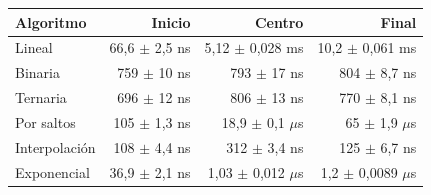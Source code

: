 {\small
\begin{tabular}{lrrr}
\toprule
Algoritmo & Inicio & Centro & Final \\
\midrule
Lineal & 66,6 $\pm$ 2,5 ns & 5,12 $\pm$ 0,028 ms & 10,2 $\pm$ 0,061 ms \\
Binaria & 759 $\pm$ 10 ns & 793 $\pm$ 17 ns & 804 $\pm$ 8,7 ns \\
Ternaria & 696 $\pm$ 12 ns & 806 $\pm$ 13 ns & 770 $\pm$ 8,1 ns \\
Por saltos & 105 $\pm$ 1,3 ns & 18,9 $\pm$ 0,1 $\mu$s & 65 $\pm$ 1,9 $\mu$s \\
Interpolaci\'on & 108 $\pm$ 4,4 ns & 312 $\pm$ 3,4 ns & 125 $\pm$ 6,7 ns \\
Exponencial & 36,9 $\pm$ 2,1 ns & 1,03 $\pm$ 0,012 $\mu$s & 1,2 $\pm$ 0,0089 $\mu$s \\
\bottomrule
\end{tabular}}\par
